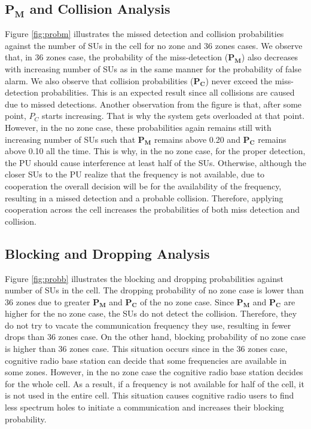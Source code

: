 \documentclass[conference,compsoc]{IEEEtran}
\newcommand{\probm}{\mathbf{P_M}}
\newcommand{\CR}{cognitive radio }
\begin{document}
\subsection{$\probm$ and Collision Analysis}
Figure \ref{fig:probm} illustrates the missed detection and collision probabilities against the number of SUs in the cell for no zone and 36 zones cases. We observe that, in 36 zones case, the probability of the miss-detection ($\probm$) also decreases with increasing number of SUs as in the same manner for the probability of false alarm. We also observe that collision probabilities ($\mathbf{P_C}$) never exceed the miss-detection probabilities. This is an expected result since all collisions are caused due to missed detections. Another observation from the figure is that, after some point, $P_C$ starts increasing. That is why the system gets overloaded at that point. However, in the no zone case, these probabilities again remains still with increasing number of SUs such that $\probm$ remains above 0.20 and $\mathbf{P_C}$ remains above 0.10 all the time. This is why, in the no zone case, for the proper detection, the PU should cause interference at least half of the SUs. Otherwise, although the closer SUs to the PU realize that the frequency is not available, due to cooperation the overall decision will be for the availability of the frequency, resulting in a missed detection and a probable collision. Therefore, applying cooperation across the cell increases the probabilities of both miss detection and collision.

\subsection{Blocking and Dropping Analysis}
Figure \ref{fig:probb} illustrates the blocking and dropping probabilities against number of SUs in the cell. The dropping probability of no zone case is lower than 36 zones due to greater $\probm$ and $\mathbf{P_C}$ of the no zone case. Since $\probm$ and $\mathbf{P_C}$ are higher for the no zone case, the SUs do not detect the collision. Therefore, they do not try to vacate the communication frequency they use, resulting in fewer drops than 36 zones case. On the other hand, blocking probability of no zone case is higher than 36 zones case. This situation occurs since in the 36 zones case, \CR base station can decide that some frequencies are available in some zones. However, in the no zone case the \CR base station decides for the whole cell. As a result, if a frequency is not available for half of the cell, it is  not used in the entire cell. This situation causes \CR users to find less spectrum holes to initiate a communication and increases their blocking probability.
\end{document}
